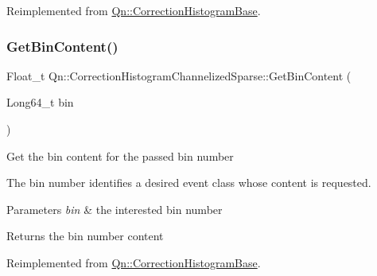 Reimplemented from \mbox{\hyperlink{classQn_1_1CorrectionHistogramBase_acfde166908e4da950470841f21f87fb9}{Qn\+::\+Correction\+Histogram\+Base}}.

\mbox{\label{classQn_1_1CorrectionHistogramChannelizedSparse_a247aa9d6cadd6c5373ed4cf0cde8b719}} 
\subsubsection{\texorpdfstring{Get\+Bin\+Content()}{GetBinContent()}}
{\footnotesize\ttfamily Float\+\_\+t Qn\+::\+Correction\+Histogram\+Channelized\+Sparse\+::\+Get\+Bin\+Content (\begin{DoxyParamCaption}\item[{Long64\+\_\+t}]{bin }\end{DoxyParamCaption})\hspace{0.3cm}{\ttfamily [virtual]}}

Get the bin content for the passed bin number

The bin number identifies a desired event class whose content is requested.


\begin{DoxyParams}{Parameters}
{\em bin} & the interested bin number \\
\hline
\end{DoxyParams}
\begin{DoxyReturn}{Returns}
the bin number content 
\end{DoxyReturn}


Reimplemented from \mbox{\hyperlink{classQn_1_1CorrectionHistogramBase_a9e4e745a6f4cbebf5b9277d6d63bc9c7}{Qn\+::\+Correction\+Histogram\+Base}}.

\mbox{\label{classQn_1_1CorrectionHistogramChannelizedSparse_a1b683c6af5cf7dea4d0ee9fa367e0d09}} 
